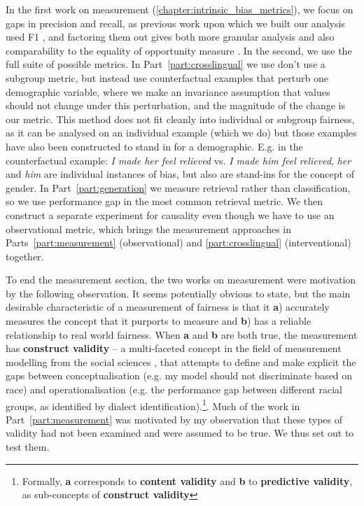 In the first work on measurement (\ref{chapter:intrinsic_bias_metrics}), we focus on gaps in precision and recall, as previous work upon which we built our analysis used F1 \citep{zhao-etal-2018-gender}, and factoring them out gives both more granular analysis and also comparability to the equality of opportunity measure \citep{hardt2016equality}. In the second, we use the full suite of possible metrics. In Part~\ref{part:crosslingual} we use don't use a subgroup metric, but instead use counterfactual examples that perturb one demographic variable, where we make an invariance assumption that values should not change under this perturbation, and the magnitude of the change is our metric. This method does not fit cleanly into individual or subgroup fairness, as it can be analysed on an individual example (which we do) but those examples have also been constructed to stand in for a demographic. E.g. in the counterfactual example: \textit{I made her feel relieved} vs. \textit{I made him feel relieved}, \textit{her} and \textit{him} are individual instances of bias, but also are stand-ins for the concept of gender. 
In Part~\ref{part:generation} we measure retrieval rather than classification, so we use performance gap in the most common retrieval metric.  We then construct a separate experiment for causality even though we have to use an observational metric, which brings the measurement approaches in Parts~\ref{part:measurement} (observational) and \ref{part:crosslingual} (interventional) together.

To end the measurement section, the two works on measurement were motivation by the following observation. It seems potentially obvious to state, but the main desirable characteristic of a measurement of fairness is that it \textbf{a}) accurately measures the concept that it purports to measure and \textbf{b}) has a reliable relationship to real world fairness. When \textbf{a} and \textbf{b} are both true, the measurement has \textbf{construct validity} -- a multi-faceted concept in the field of measurement modelling from the social sciences \citep{jacobsandwallach}, that attempts to define and make explicit the gaps between conceptualisation (e.g. my model should not discriminate based on race) and operationalisation (e.g. the performance gap between different racial groups, as identified by dialect identification).\footnote{Formally, \textbf{a} corresponds to \textbf{content validity} and \textbf{b} to \textbf{predictive validity}, as sub-concepts of \textbf{construct validity} }. Much of the work in Part~\ref{part:measurement} was motivated by my observation that these types of validity had not been examined and were assumed to be true. We thus set out to test them.

